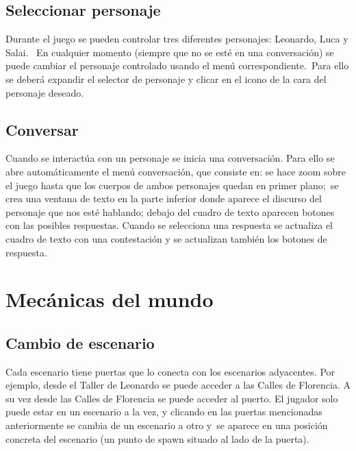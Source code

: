 \subsection[Seleccionar personaje]{ Seleccionar personaje}
\hypertarget{Toc484614252}{}{
Durante el juego se pueden controlar tres diferentes personajes: Leonardo, Luca y Salai. \ En cualquier momento (siempre
que no se est\'e en una conversaci\'on) se puede cambiar el personaje controlado usando el men\'u
correspondiente.\ Para ello se deber\'a expandir el selector de personaje y clicar en el icono de la cara del personaje
deseado.}

\subsection[Conversar]{ Conversar}
\hypertarget{Toc484614253}{}{
Cuando se interact\'ua con un personaje se inicia una conversaci\'on. Para ello se abre autom\'aticamente el men\'u
conversaci\'on, que consiste en: se hace zoom sobre el juego hasta que los cuerpos de ambos personajes quedan en primer
plano;\ se crea una ventana de texto en la parte inferior donde aparece el discurso del personaje que nos est\'e
hablando; debajo del cuadro de texto aparecen botones con las posibles respuestas. Cuando se selecciona una respuesta
se actualiza el cuadro de texto con una contestaci\'on y se actualizan tambi\'en los botones de respuesta.}

\section[Mec\'anicas del mundo]{ Mec\'anicas del mundo}
\hypertarget{Toc484614254}{}\subsection[Cambio de escenario]{ Cambio de escenario}
\hypertarget{Toc484614255}{}{
Cada escenario tiene puertas que lo conecta con los escenarios adyacentes. Por ejemplo, desde el Taller de Leonardo se
puede acceder a las Calles de Florencia. A su vez desde las Calles de Florencia se puede acceder al puerto. El jugador
solo puede estar en un escenario a la vez, y clicando en las puertas mencionadas anteriormente se cambia de un
escenario a otro y\ se aparece en una posici\'on concreta del escenario (un punto de spawn situado al lado de la
puerta).}

